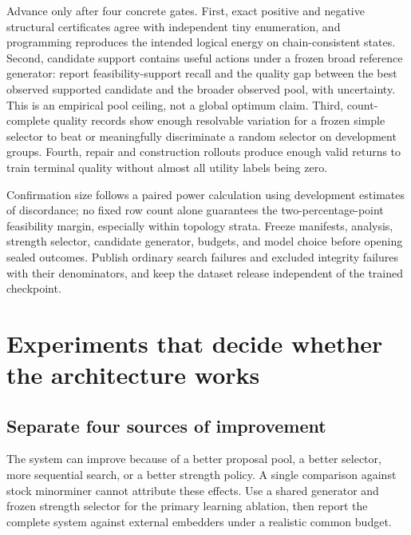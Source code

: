\documentclass[11pt,a4paper]{article}
\theoremstyle{definition}\newtheorem{definition}[proposition]{Definition}
\begin{document}
Advance only after four concrete gates. First, exact positive and negative structural certificates agree with independent tiny enumeration, and programming reproduces the intended logical energy on chain-consistent states. Second, candidate support contains useful actions under a frozen broad reference generator: report feasibility-support recall and the quality gap between the best observed supported candidate and the broader observed pool, with uncertainty. This is an empirical pool ceiling, not a global optimum claim. Third, count-complete quality records show enough resolvable variation for a frozen simple selector to beat or meaningfully discriminate a random selector on development groups. Fourth, repair and construction rollouts produce enough valid returns to train terminal quality without almost all utility labels being zero.

Confirmation size follows a paired power calculation using development estimates of discordance; no fixed row count alone guarantees the two-percentage-point feasibility margin, especially within topology strata. Freeze manifests, analysis, strength selector, candidate generator, budgets, and model choice before opening sealed outcomes. Publish ordinary search failures and excluded integrity failures with their denominators, and keep the dataset release independent of the trained checkpoint.
 \section{Experiments that decide whether the architecture works}\label{sec:evaluation}
\subsection{Separate four sources of improvement}
The system can improve because of a better proposal pool, a better selector, more sequential search, or a better strength policy. A single comparison against stock minorminer cannot attribute these effects. Use a shared generator and frozen strength selector for the primary learning ablation, then report the complete system against external embedders under a realistic common budget.
\end{document}
